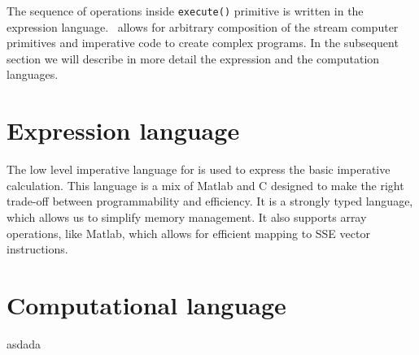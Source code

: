 The sequence of operations inside \lstinline|execute()| primitive is written in the \LANG expression language. \LANG\ allows for arbitrary composition of the stream 
computer primitives and imperative code to create complex programs.
In the subsequent section we will describe in more detail the expression and the computation languages.



\section{Expression language}
\label{sec:lang:expression}

The low level imperative language for \LANG is used to express the basic imperative
calculation. This language is a mix of Matlab and C designed to make
the right trade-off between programmability and efficiency. It is a
strongly typed language, which allows us to simplify memory
management. It also supports array operations, like Matlab, which
allows for efficient mapping to SSE vector instructions.  






\section{Computational language}
\label{sec:lang:computation}

asdada
